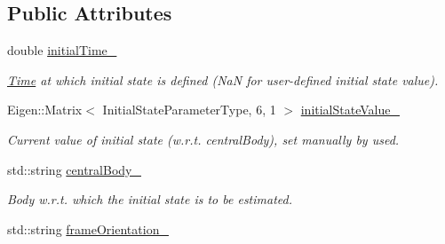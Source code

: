 \subsection*{Public Attributes}
\begin{DoxyCompactItemize}
\item 
double \hyperlink{classtudat_1_1estimatable__parameters_1_1InitialTranslationalStateEstimatableParameterSettings_a6ce7e1d3a6c6e488d24858a913ef52b8}{initial\+Time\+\_\+}\hypertarget{classtudat_1_1estimatable__parameters_1_1InitialTranslationalStateEstimatableParameterSettings_a6ce7e1d3a6c6e488d24858a913ef52b8}{}\label{classtudat_1_1estimatable__parameters_1_1InitialTranslationalStateEstimatableParameterSettings_a6ce7e1d3a6c6e488d24858a913ef52b8}

\begin{DoxyCompactList}\small\item\em \hyperlink{classtudat_1_1Time}{Time} at which initial state is defined (NaN for user-\/defined initial state value). \end{DoxyCompactList}\item 
Eigen\+::\+Matrix$<$ Initial\+State\+Parameter\+Type, 6, 1 $>$ \hyperlink{classtudat_1_1estimatable__parameters_1_1InitialTranslationalStateEstimatableParameterSettings_a33b322bb83c28fbf844bd7a65de7abdc}{initial\+State\+Value\+\_\+}\hypertarget{classtudat_1_1estimatable__parameters_1_1InitialTranslationalStateEstimatableParameterSettings_a33b322bb83c28fbf844bd7a65de7abdc}{}\label{classtudat_1_1estimatable__parameters_1_1InitialTranslationalStateEstimatableParameterSettings_a33b322bb83c28fbf844bd7a65de7abdc}

\begin{DoxyCompactList}\small\item\em Current value of initial state (w.\+r.\+t. central\+Body), set manually by used. \end{DoxyCompactList}\item 
std\+::string \hyperlink{classtudat_1_1estimatable__parameters_1_1InitialTranslationalStateEstimatableParameterSettings_a0d4dd2d34e7689da2e793604d4a65679}{central\+Body\+\_\+}\hypertarget{classtudat_1_1estimatable__parameters_1_1InitialTranslationalStateEstimatableParameterSettings_a0d4dd2d34e7689da2e793604d4a65679}{}\label{classtudat_1_1estimatable__parameters_1_1InitialTranslationalStateEstimatableParameterSettings_a0d4dd2d34e7689da2e793604d4a65679}

\begin{DoxyCompactList}\small\item\em Body w.\+r.\+t. which the initial state is to be estimated. \end{DoxyCompactList}\item 
std\+::string \hyperlink{classtudat_1_1estimatable__parameters_1_1InitialTranslationalStateEstimatableParameterSettings_a59c28541f7a3b447b6064d8d1f2292c4}{frame\+Orientation\+\_\+}\hypertarget{classtudat_1_1estimatable__parameters_1_1InitialTranslationalStateEstimatableParameterSettings_a59c28541f7a3b447b6064d8d1f2292c4}{}\label{classtudat_1_1estimatable__parameters_1_1InitialTranslationalStateEstimatableParameterSettings_a59c28541f7a3b447b6064d8d1f2292c4}


\end{DoxyCompactItemize}
